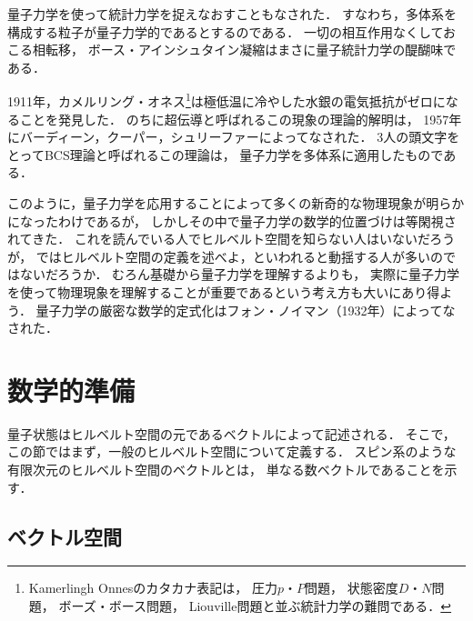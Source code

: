 \documentclass[
]{sotsu}
\begin{document}
量子力学を使って統計力学を捉えなおすこともなされた．
すなわち，多体系を構成する粒子が量子力学的であるとするのである．
一切の相互作用なくしておこる相転移，
ボース・アインシュタイン凝縮はまさに量子統計力学の醍醐味である．


1911年，カメルリング・オネス\footnote{
    Kamerlingh Onnesのカタカナ表記は，
    圧力$p$・$P$問題，
    状態密度$D$・$N$問題，
    ボーズ・ボース問題，
    Liouville問題と並ぶ統計力学の難問である．
}は極低温に冷やした水銀の電気抵抗がゼロになることを発見した．
のちに超伝導と呼ばれるこの現象の理論的解明は，
1957年にバーディーン，クーパー，シュリーファーによってなされた．
3人の頭文字をとってBCS理論と呼ばれるこの理論は，
量子力学を多体系に適用したものである．


このように，量子力学を応用することによって多くの新奇的な物理現象が明らかになったわけであるが，
しかしその中で量子力学の数学的位置づけは等閑視されてきた．
これを読んでいる人でヒルベルト空間を知らない人はいないだろうが，
ではヒルベルト空間の定義を述べよ，といわれると動揺する人が多いのではないだろうか．
むろん基礎から量子力学を理解するよりも，
実際に量子力学を使って物理現象を理解することが重要であるという考え方も大いにあり得よう．
量子力学の厳密な数学的定式化はフォン・ノイマン（1932年）によってなされた．







\section{数学的準備}

量子状態はヒルベルト空間の元であるベクトルによって記述される．
そこで，この節ではまず，一般のヒルベルト空間について定義する．
スピン系のような有限次元のヒルベルト空間のベクトルとは，
単なる数ベクトルであることを示す．


\subsection{ベクトル空間}
\end{document}
